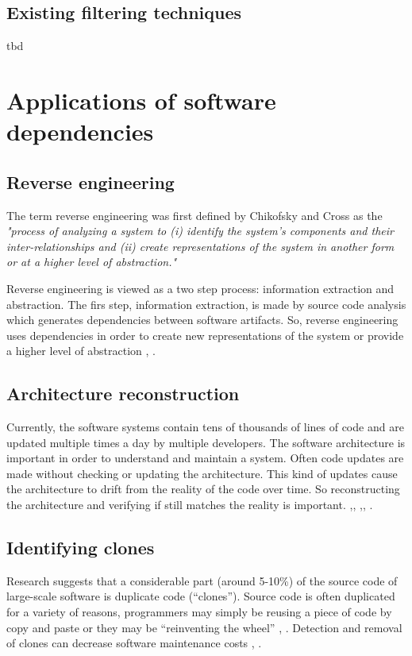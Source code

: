 \subsection{Existing filtering techniques}
tbd


\section{Applications of software dependencies}
\label{app}

\subsection{Reverse engineering}
The term reverse engineering was first defined by Chikofsky and Cross \cite{ChikofskyReverse} as the \textit{"process of analyzing a system to (i) identify the system’s components and
their inter-relationships and (ii) create representations of the system in another form or at a higher level of abstraction."} 

Reverse engineering is viewed as a two step process: information extraction and abstraction. \cite{FoSEReverseEngineering} 
The firs step, information extraction, is made by source code analysis which generates dependencies between software artifacts. So, reverse engineering uses dependencies in order to create new representations of the system or provide a higher level of abstraction \cite{struct_dep}, \cite{Gueheneuc}.

\subsection{Architecture reconstruction}
Currently, the software systems contain tens of thousands of lines of code and are updated multiple times a day by multiple developers.  
The software architecture is important in order to understand and maintain a system. Often code updates are made without checking or updating the architecture.
This kind of updates cause the architecture to drift from the reality of the code over time. So reconstructing the architecture and verifying if still matches the reality is important. \cite{sar},\cite{PagerankENASE}, \cite{Bass-archreconstruction} ,\cite{RecoverySartipi}, \cite{model-bennett}.

\subsection{Identifying clones}
Research suggests that a considerable part (around 5-10\%) of the source code of large-scale software is duplicate code (“clones”). Source code is often duplicated for a variety of reasons, programmers may simply be reusing a piece of code by copy and paste or they may be “reinventing the wheel” \cite{ClonesMayrand}, \cite{clones}.
Detection and removal of clones can decrease software maintenance costs \cite{CloneDetection}, \cite{cloneKamiya}.

